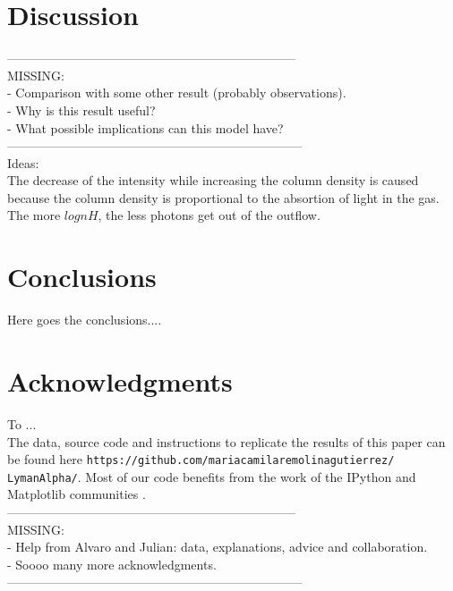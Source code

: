\documentclass{latex/emulateapj}
\begin{document}
\section{Discussion}
\label{sec:discussion}

---------------------------------------------------------------------\\
MISSING: \\
- Comparison with some other result (probably observations).\\
- Why is this result useful? \\
- What possible implications can this model have?\\
-----------------------------------------------------------------------\\

Ideas: \\

The decrease of the intensity while increasing the column density is caused because the column density is proportional to the absortion of light in the gas. The more $log{nH}$, the less photons get out of the outflow. 

\section{Conclusions}
\label{sec:conclusions}
Here goes the conclusions....

\section*{Acknowledgments}

To ...\\

The data, source code and instructions to
replicate the results of this paper can be found
here {\texttt{https://github.com/mariacamilaremolinagutierrez/ LymanAlpha/}}.
Most of our code benefits from the work of the IPython and Matplotlib
communities \citep{IPython,matplotlib}.\\

---------------------------------------------------------------------\\
MISSING: \\
- Help from Alvaro and Julian: data, explanations, advice and collaboration. \\
- Soooo many more acknowledgments.\\
-----------------------------------------------------------------------\\
\end{document}
